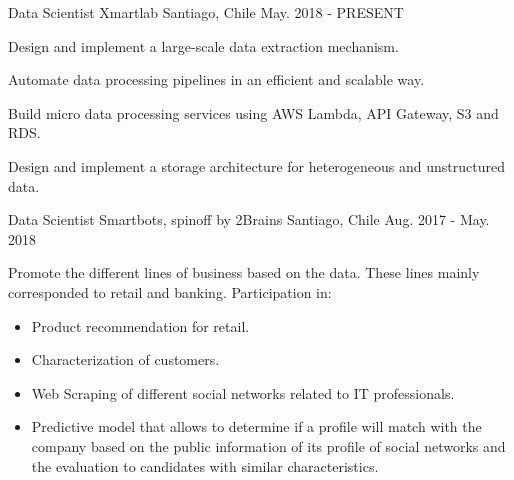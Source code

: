 

\begin{cventries}

  \cventry
    {Data Scientist} %
    {Xmartlab} %
    {Santiago, Chile} %
    {May. 2018 - PRESENT} %
    {
      \begin{cvitems} %
        \item {Design and implement a large-scale data extraction mechanism.}
        \item {Automate data processing pipelines in an efficient and scalable way.}
        \item {Build micro data processing services using AWS Lambda, API Gateway, S3 and RDS.}
        \item {Design and implement a storage architecture for heterogeneous and unstructured data.}
      \end{cvitems}
    }
  \cventry
    {Data Scientist} %
    {Smartbots, spinoff by 2Brains} %
    {Santiago, Chile} %
    {Aug. 2017 - May. 2018} %
    {
      \begin{cvitems} %
        \item {Promote the different lines of business based on the data. These lines mainly corresponded to retail and banking. Participation in:}
      	\begin{itemize}
        	\item{Product recommendation for retail.}
        	\item{Characterization of customers.}
        	\item{Web Scraping of different social networks related to IT professionals.}
        	\item{Predictive model that allows to determine if a profile will match with the company based on the public information of its profile of social networks and the evaluation to candidates with similar characteristics.}
      	\end{itemize}
      \end{cvitems}
    }


\end{cventries}
